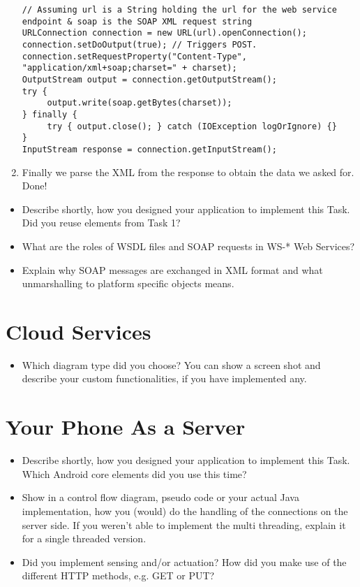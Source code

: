 \documentclass{report}
\begin{document}
\begin{enumerate}
	\begin{lstlisting}
// Assuming url is a String holding the url for the web service endpoint & soap is the SOAP XML request string
URLConnection connection = new URL(url).openConnection();
connection.setDoOutput(true); // Triggers POST.
connection.setRequestProperty("Content-Type", "application/xml+soap;charset=" + charset);
OutputStream output = connection.getOutputStream();
try {
     output.write(soap.getBytes(charset));
} finally {
     try { output.close(); } catch (IOException logOrIgnore) {}
}
InputStream response = connection.getInputStream();
	\end{lstlisting}
	\item Finally we parse the XML from the response to obtain the data we asked for. Done!
\end{enumerate}

\begin{itemize}
	\item Describe shortly, how you designed your application to implement this Task. Did you reuse elements from Task 1?
	\item What are the roles of WSDL files and SOAP requests in WS-* Web Services?
	\item Explain why SOAP messages are exchanged in XML format and what unmarshalling to platform specific objects means.
\end{itemize}

\section{Cloud Services}
\begin{itemize}
	\item Which diagram type did you choose? You can show a screen shot and describe your custom functionalities, if you have implemented any.
\end{itemize}

\section{Your Phone As a Server}
\begin{itemize}
	\item Describe shortly, how you designed your application to implement this Task. Which Android core elements did you use this time?
	\item Show in a control flow diagram, pseudo code or your actual Java implementation, how you (would) do the handling of the connections on the server side. If you weren't able to implement the multi threading, explain it for a single threaded version.
	\item Did you implement sensing and/or actuation? How did you make use of the different HTTP methods, e.g. GET or PUT?
\end{itemize}
\end{document}
